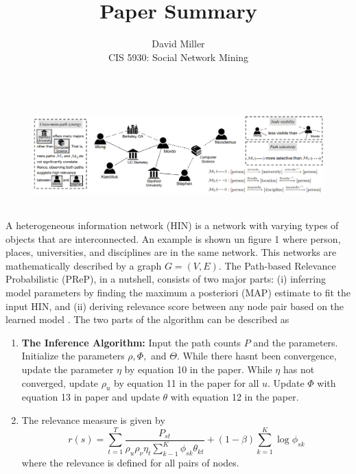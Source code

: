 \documentclass[12pt]{article}
\theoremstyle{remark}
\begin{document}
	
	\title{Paper Summary}
	\author{David Miller \\ 
		CIS 5930: Social Network Mining} 
	
	\maketitle 
	
	\begin{figure}[H]{}
		\centering
		\vspace{-15pt}
		\hspace{-10pt}
		\includegraphics[height=4cm,width=1\textwidth]{fig1.eps}
		\caption{}
		\vspace{0pt}
	\end{figure} 
	
	A heterogeneous information network (HIN) is a network with varying types of objects that are interconnected. An example is shown un figure 1 where person, places, universities, and disciplines are in the same network. This networks are mathematically described by a graph $G = (V,E)$. The Path-based Relevance Probabilistic (PReP), in a nutshell, consists of two major parts: (i) inferring model parameters by finding the maximum a posteriori (MAP) estimate to fit the input HIN, and (ii) deriving relevance score between any node pair based on the learned model \cite{paper}. The two parts of the algorithm can be described as
	
	\begin{enumerate}
		\item \textbf{The Inference Algorithm:} Input the path counts $P$ and the parameters. Initialize the parameters $\rho, \Phi,$ and $\Theta$. While there hasnt been convergence, update the parameter $\eta$ by equation 10 in the paper. While $\eta$ has not converged, update $\rho_u$ by equation 11 in the paper for all $u$. Update $\Phi$ with equation 13 in paper and update $\theta$ with equation 12 in the paper.
		\item The relevance measure is given by
		$$ r(s) = \sum\limits_{t=1}^T \frac{P_{st}}{\rho_u\rho_\nu\eta_t\sum_{k-1}^K \phi_{sk}\theta_{kt}} + (1 - \beta)\sum\limits_{k=1}^K \log\phi_{sk} $$
		where the relevance is defined for all pairs of nodes.
	\end{enumerate}
	
\end{document}
